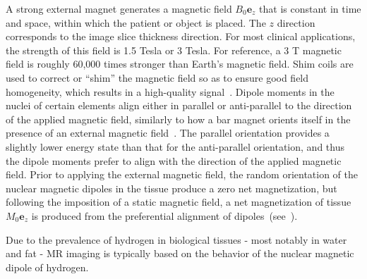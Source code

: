 A strong external magnet generates a magnetic field $B_0\bm{e}_z$ that is constant in time and space, within which the patient or object is placed. The $z$ direction corresponds to the image slice thickness direction. For most clinical applications, the strength of this field is 1.5 Tesla or 3 Tesla. For reference, a 3 T magnetic field is roughly 60,000 times stronger than Earth's magnetic field. Shim coils are used to correct or ``shim'' the magnetic field so as to ensure good field homogeneity, which results in a high-quality signal~\cite{jacobs_2007}. Dipole moments in the nuclei of certain elements align either in parallel or anti-parallel to the direction of the applied magnetic field, similarly to how a bar magnet orients itself in the presence of an external magnetic field~\cite{hendrick_1994}. The parallel orientation provides a slightly lower energy state than that for the anti-parallel orientation, and thus the dipole moments prefer to align with the direction of the applied magnetic field. Prior to applying the external magnetic field, the random orientation of the nuclear magnetic dipoles in the tissue produce a zero net magnetization, but following the imposition of a static magnetic field, a net magnetization of tissue $M_0\bm{e}_z$ is produced from the preferential alignment of dipoles~(see~).

Due to the prevalence of hydrogen in biological tissues - most notably in water and fat - MR imaging is typically based on the behavior of the nuclear magnetic dipole of hydrogen.

